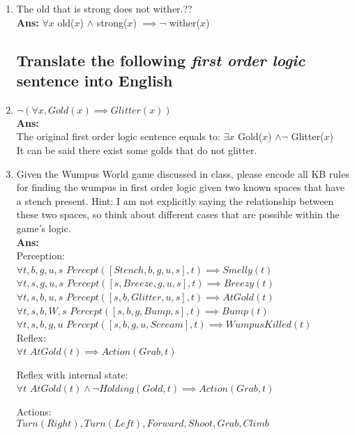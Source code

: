 \documentclass[12pt]{article}
\begin{document}
\begin{enumerate}
\item{The old that is strong does not wither.}??\\
\textbf{Ans:} $\forall x$ old($x$) $\land$ strong($x$) $\implies \lnot$ wither($x$) 

\subsection*{Translate the following \emph{first order logic} sentence into English}

\item{\(\lnot ( \forall x, Gold(x) \implies Glitter(x))\)}\\
\textbf{Ans:}\\
The original first order logic sentence equals to: $\exists x$ Gold($x$) $\land \lnot$ Glitter($x$)\\
It can be said there exist some golds that do not glitter.

\vspace*{3\baselineskip}
\item{Given the Wumpus World game discussed in class, please encode all KB rules for finding the wumpus in first order logic given two known spaces that have a stench present. Hint: I am not explicitly saying the relationship between these two spaces, so think about different cases that are possible within the game's logic.}\\
\textbf{Ans:}\\
Perception:\\
\(\forall t, b, g, u, s\) \(Percept([Stench, b, g, u, s], t) \implies Smelly(t)\)\\
\(\forall t, s, g, u, s\) \(Percept([s, Breeze, g, u, s], t) \implies Breezy(t)\)\\
\(\forall t, s, b, u, s\) \(Percept([s, b, Glitter, u, s], t) \implies
AtGold(t)\)\\
\(\forall t, s, b, W, s\) \(Percept([s, b, g, Bump, s], t) \implies Bump(t)\)\\
\(\forall t, s, b, g, u\) \(Percept([s, b, g, u, Scream], t) \implies WumpusKilled(t)\)\\

Reflex:\\
\(\forall t\) \(AtGold(t) \implies Action(Grab, t)\)

Reflex with internal state:\\
\(\forall t\) \(AtGold(t) \land \lnot Holding(Gold, t) \implies Action(Grab, t)\)

Actions:\\
$Turn(Right), Turn(Left), Forward, Shoot, Grab, Climb$


\end{enumerate}
\end{document}
